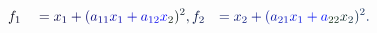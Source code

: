 \documentclass[12pt]{article}
\begin{document}
\makeatletter
\renewcommand*{\@textcolor}[3]{%
  \protect\leavevmode
  \begingroup
    \color#1{#2}#3%
  \endgroup
}
\makeatother
\begin{displaymath}
\begin{array} {rlr} \displaystyle { \mathcolor[RGB]{0,0,15}{f} _ { \mathcolor[RGB]{0,0,30}{1} } } & \displaystyle { { } \mathcolor[RGB]{0,0,45}{=} \mathcolor[RGB]{0,0,60}{x} _ { \mathcolor[RGB]{0,0,75}{1} } \mathcolor[RGB]{0,0,90}{+} \mathcolor[RGB]{0,0,105}{(} \mathcolor[RGB]{0,0,120}{a} _ { \mathcolor[RGB]{0,0,135}{1} \mathcolor[RGB]{0,0,150}{1} } \mathcolor[RGB]{0,0,165}{x} _ { \mathcolor[RGB]{0,0,180}{1} } \mathcolor[RGB]{0,0,195}{+} \mathcolor[RGB]{0,0,210}{a} _ { \mathcolor[RGB]{0,0,225}{1} \mathcolor[RGB]{0,0,240}{2} } \mathcolor[RGB]{0,0,255}{x} _ { \mathcolor[RGB]{0,15,0}{2} } \mathcolor[RGB]{0,15,15}{)} ^ { \mathcolor[RGB]{0,15,30}{2} } \mathcolor[RGB]{0,15,45}{,} \mathcolor[RGB]{0,15,60}{f} _ { \mathcolor[RGB]{0,15,75}{2} } } & \displaystyle { \mathcolor[RGB]{0,15,90}{=} \mathcolor[RGB]{0,15,105}{x} _ { \mathcolor[RGB]{0,15,120}{2} } \mathcolor[RGB]{0,15,135}{+} \mathcolor[RGB]{0,15,150}{(} \mathcolor[RGB]{0,15,165}{a} _ { \mathcolor[RGB]{0,15,180}{2} \mathcolor[RGB]{0,15,195}{1} } \mathcolor[RGB]{0,15,210}{x} _ { \mathcolor[RGB]{0,15,225}{1} } \mathcolor[RGB]{0,15,240}{+} \mathcolor[RGB]{0,15,255}{a} _ { \mathcolor[RGB]{0,30,0}{2} \mathcolor[RGB]{0,30,15}{2} } \mathcolor[RGB]{0,30,30}{x} _ { \mathcolor[RGB]{0,30,45}{2} } \mathcolor[RGB]{0,30,60}{)} ^ { \mathcolor[RGB]{0,30,75}{2} } \mathcolor[RGB]{0,30,90}{.} } \end{array}
\end{displaymath}
\end{document}
